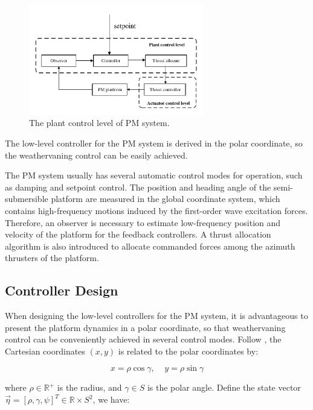 \begin{sloppypar}
\begin{figure}[htbp]
	\centering
	\includegraphics[width=3.0in]{Images/plant_control_level.pdf}
	\caption{The plant control level of PM system.}
	\label{fig:plant}
\end{figure}

The low-level controller for the PM system is derived in the polar coordinate, so the weathervaning control can be easily achieved.

The PM system usually has several automatic control modes for operation, such as damping and setpoint control. The position and heading angle of the semi-submersible platform are measured in the global coordinate system, which contains high-frequency motions induced by the first-order wave excitation forces. Therefore, an observer is necessary to estimate low-frequency position and velocity of the platform for the feedback controllers. A thrust allocation algorithm is also introduced to allocate commanded forces among the azimuth thrusters of the platform.

\subsection{Controller Design}

When designing the low-level controllers for the PM system, it is advantageous to present the platform dynamics in a polar coordinate, so that weathervaning control can be conveniently achieved in several control modes. Follow \cite{fossen2001nonlinear}, the Cartesian coordinates $(x, y)$ is related to the polar coordinates by:

\begin{equation}
x = \rho\cos \gamma,\;\;\;\; y = \rho\sin \gamma
\end{equation}

\noindent where $\rho \in \mathbb{R}^+$ is the radius, and $\gamma \in S$ is the polar angle. Define the state vector $\vec{\eta} = [\rho, \gamma, \psi]^T \in \mathbb{R} \times S^2$, we have:


\end{sloppypar}
